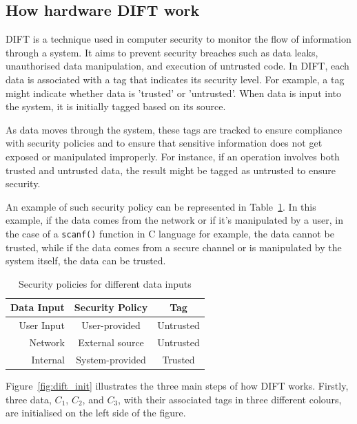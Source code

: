 \subsection{How hardware DIFT work}
DIFT is a technique used in computer security to monitor the flow of information through a system. It aims to prevent security breaches such as data leaks, unauthorised data manipulation, and execution of untrusted code. In DIFT, each data is associated with a tag that indicates its security level.
For example, a tag might indicate whether data is 'trusted' or 'untrusted'. When data is input into the system, it is initially tagged based on its source.

As data moves through the system, these tags are tracked to ensure compliance with security policies and to ensure that sensitive information does not get exposed or manipulated improperly. For instance, if an operation involves both trusted and untrusted data, the result might be tagged as untrusted to ensure security.

An example of such security policy can be represented in Table~\ref{table:security_policies}. In this example, if the data comes from the network or if it's manipulated by a user, in the case of a \verb|scanf()| function in C language for example, the data cannot be trusted, while if the data comes from a secure channel or is manipulated by the system itself, the data can be trusted.

\begin{table}[ht]
    \centering
    \caption{Security policies for different data inputs}
    \label{table:security_policies}
    \begin{tabular}{@{}rcc@{}}
        \toprule
        \textbf{Data Input} & \textbf{Security Policy} & \textbf{Tag}     \\ \midrule
        User Input          & User-provided            & Untrusted        \\ \hline
        Network             & External source          & Untrusted        \\ \hline
        Internal            & System-provided          & Trusted          \\
        \bottomrule
    \end{tabular}
\end{table}

Figure~\ref{fig:dift_init} illustrates the three main steps of how DIFT works. Firstly, three data, $C_1$, $C_2$, and $C_3$, with their associated tags in three different colours, are initialised on the left side of the figure.

